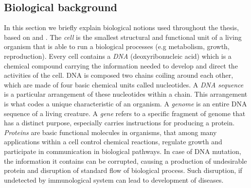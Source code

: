 \documentclass[12pt, wide]{mwart}
\begin{document}
\subsection{Biological background} \label{section:bio}
In this section we briefly explain biological notions used throughout the thesis, based on \cite{NHGRI} and \cite[chapters~11,12]{GeneExpr}. The \textit{cell} is the smallest structural and functional unit of a living organism that is able to run a biological processes (e.g metabolism, growth, reproduction). Every cell contains a \textit{DNA} (deoxyribonucleic acid) which is a chemical compound carrying the information needed to develop and direct the activities of the cell. DNA is composed two chains coiling around each other, which are made of four basic chemical units called nucleotides. A \textit{DNA sequence} is a particular arrangement of these nucleotides within a chain. This arrangement is what codes a unique characteristic of an organism. A \textit{genome} is an entire DNA sequence of a living creature. A \textit{gene} refers to a specific fragment of genome that has a distinct purpose, especially carries instructions for producing a protein. \textit{Proteins} are basic functional molecules in organisms, that among many applications within a cell control chemical reactions, regulate growth and participate in communication in biological pathways. In case of DNA mutation, the information it contains can be corrupted, causing a production of undesirable protein and disruption of standard flow of biological process. Such disruption, if undetected by immunological system can lead to development of diseases.
\end{document}
